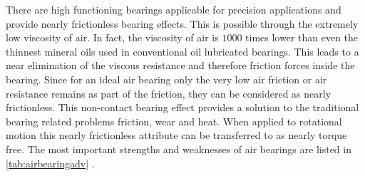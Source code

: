 There are high functioning bearings applicable for precision applications and provide nearly frictionless bearing effects. This is possible through the extremely low viscosity of air. In fact, the viscosity of air is $1000$ times lower than even the thinnest mineral oils used in conventional oil lubricated bearings. This leads to a near elimination of the viscous resistance and therefore friction forces inside the bearing. Since for an ideal air bearing only the very low air friction or air resistance remains as part of the friction, they can be considered as nearly frictionless. This non-contact bearing effect provides a solution to the traditional bearing related problems friction, wear and heat. When applied to rotational motion this nearly frictionless attribute can be transferred to as nearly torque free. The most important strengths and weaknesses of air bearings are listed in \autoref{tab:airbearingadv} \cite{Hamrock.1991}\cite{Gao.2019}\cite{NewWayAirBearingsInc..2006}\cite{Wang.1993}.\\


